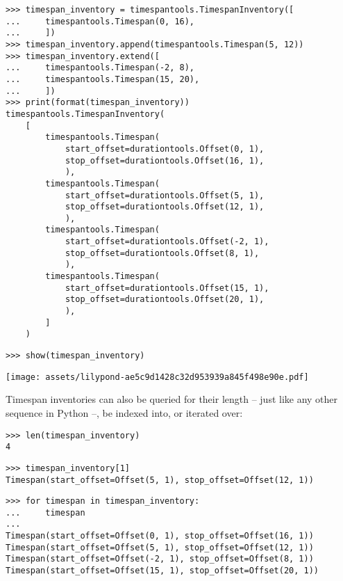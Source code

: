 \begin{singlespacing}
\vspace{-0.5\baselineskip}
\begin{lstlisting}
>>> timespan_inventory = timespantools.TimespanInventory([
...     timespantools.Timespan(0, 16),
...     ])
>>> timespan_inventory.append(timespantools.Timespan(5, 12))
>>> timespan_inventory.extend([
...     timespantools.Timespan(-2, 8),
...     timespantools.Timespan(15, 20),
...     ])
>>> print(format(timespan_inventory))
timespantools.TimespanInventory(
    [
        timespantools.Timespan(
            start_offset=durationtools.Offset(0, 1),
            stop_offset=durationtools.Offset(16, 1),
            ),
        timespantools.Timespan(
            start_offset=durationtools.Offset(5, 1),
            stop_offset=durationtools.Offset(12, 1),
            ),
        timespantools.Timespan(
            start_offset=durationtools.Offset(-2, 1),
            stop_offset=durationtools.Offset(8, 1),
            ),
        timespantools.Timespan(
            start_offset=durationtools.Offset(15, 1),
            stop_offset=durationtools.Offset(20, 1),
            ),
        ]
    )
\end{lstlisting}
\begin{lstlisting}
>>> show(timespan_inventory)
\end{lstlisting}
\noindent\texttt{[image: assets/lilypond-ae5c9d1428c32d953939a845f498e90e.pdf]}
\end{singlespacing}

\noindent Timespan inventories can also be queried for their length -- just
like any other sequence in Python --, be indexed into, or iterated over:

\begin{comment}
<abjad>
len(timespan_inventory)
timespan_inventory[1]
for timespan in timespan_inventory:
    timespan

</abjad>
\end{comment}

\begin{singlespacing}
\vspace{-0.5\baselineskip}
\begin{lstlisting}
>>> len(timespan_inventory)
4
\end{lstlisting}
\begin{lstlisting}
>>> timespan_inventory[1]
Timespan(start_offset=Offset(5, 1), stop_offset=Offset(12, 1))
\end{lstlisting}
\begin{lstlisting}
>>> for timespan in timespan_inventory:
...     timespan
...
Timespan(start_offset=Offset(0, 1), stop_offset=Offset(16, 1))
Timespan(start_offset=Offset(5, 1), stop_offset=Offset(12, 1))
Timespan(start_offset=Offset(-2, 1), stop_offset=Offset(8, 1))
Timespan(start_offset=Offset(15, 1), stop_offset=Offset(20, 1))
\end{lstlisting}
\end{singlespacing}

